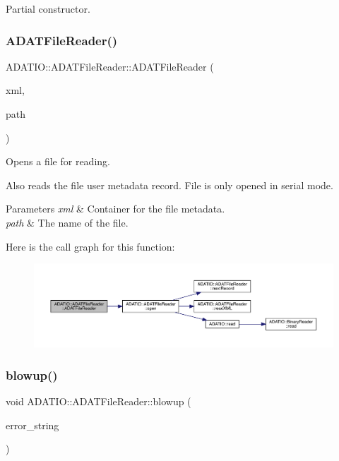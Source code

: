 Partial constructor. 

\mbox{\label{group__qio_ga096a7060d69fd109067404e75f8a06ee}} 
\subsubsection{\texorpdfstring{ADATFileReader()}{ADATFileReader()}\hspace{0.1cm}{\footnotesize\ttfamily [2/2]}}
{\footnotesize\ttfamily A\+D\+A\+T\+I\+O\+::\+A\+D\+A\+T\+File\+Reader\+::\+A\+D\+A\+T\+File\+Reader (\begin{DoxyParamCaption}\item[{\mbox{\hyperlink{classADATXML_1_1XMLReader}{X\+M\+L\+Reader}} \&}]{xml,  }\item[{const std\+::string \&}]{path }\end{DoxyParamCaption})}



Opens a file for reading. 

Also reads the file user metadata record. File is only opened in serial mode. 
\begin{DoxyParams}{Parameters}
{\em xml} & Container for the file metadata. \\
\hline
{\em path} & The name of the file. \\
\hline
\end{DoxyParams}
Here is the call graph for this function\+:\nopagebreak
\begin{figure}[H]
\begin{center}
\leavevmode
\includegraphics[width=350pt]{db/de5/group__qio_ga096a7060d69fd109067404e75f8a06ee_cgraph}
\end{center}
\end{figure}
\mbox{\label{group__qio_gaddf83cb612ce869fe7a0a5f7e559fe72}} 
\subsubsection{\texorpdfstring{blowup()}{blowup()}}
{\footnotesize\ttfamily void A\+D\+A\+T\+I\+O\+::\+A\+D\+A\+T\+File\+Reader\+::blowup (\begin{DoxyParamCaption}\item[{const std\+::string \&}]{error\+\_\+string }\end{DoxyParamCaption})\hspace{0.3cm}{\ttfamily [protected]}}



